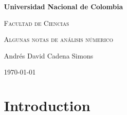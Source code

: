 \documentclass[11pt]{report}
\begin{document}

\begin{titlepage}
\centering
{\bfseries\LARGE Universidad Nacional de Colombia \par}
\vspace{1cm}
{\scshape\Large Facultad de Ciencias \par}
\vspace{3cm}
{\scshape\Huge Algunas notas de análisis númerico \par}
\vfill
{\Large Andrés David Cadena Simons \par}
\vfill
{\Large \today \par}
\end{titlepage}

\tableofcontents

\doublespacing
{} 

\chapter{Introduction}


\singlespacing

\cleardoublepage
{} %

\end{document}
